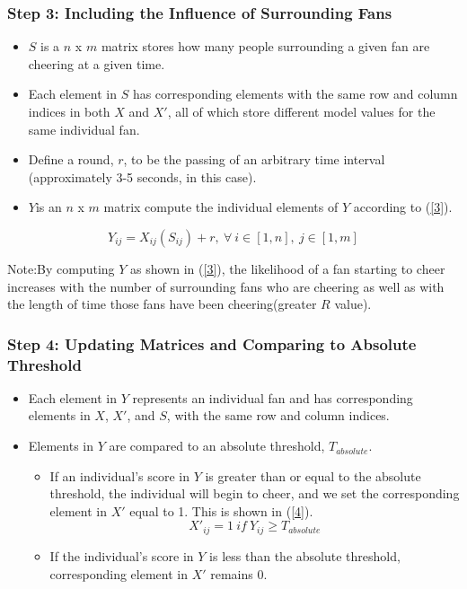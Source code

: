 \documentclass[compress,handout,10pt]{beamer}
\let\olditem\item
\renewcommand{\item}{\setlength{\itemsep}{0.5\baselineskip}\olditem}
\begin{document}
\begin{frame}
\frametitle{Step 3: Including the Influence of Surrounding Fans}
\begin{itemize}
\item $S$ is a $n$ x $m$ matrix stores how many people surrounding a given fan are cheering at a given time.
\item Each element in $S$ has corresponding elements with the same row and column indices in both $X$ and $X'$, all of which store different model values for the same individual fan. 
\item Define a round, $r$, to be the passing of an arbitrary time interval (approximately 3-5 seconds, in this case). 
\item $Y$is an $n$ x $m$ matrix compute the individual elements of $Y$ according to (\ref{3}). 
\end{itemize}
\begin{equation}
Y_{ij}=X_{ij}(S_{ij})+r,~\forall~i\in[1,n],~j\in[1,m]
\label{3}
\end{equation}
\item Note:By computing $Y$ as shown in (\ref{3}), the likelihood of a fan starting to cheer increases with the number of surrounding fans who are cheering as well as with the length of time those fans have been cheering(greater $R$ value).
\end{frame}

\begin{frame}
\frametitle{Step 4: Updating Matrices and Comparing to Absolute Threshold}
\begin{itemize}
\item Each element in $Y$ represents an individual fan and has corresponding elements in $X$, $X'$, and $S$, with the same row and column indices. 
\item Elements in $Y$  are compared to an absolute threshold, $T_{absolute}$.
	\begin{itemize} 
		\item If an individual's score in $Y$ is greater than or equal to the absolute threshold, the individual will begin to cheer, and we set the corresponding element in $X'$ equal to 1. This is shown in (\ref{4}).
		\begin{equation}
			X'_{ij}=1~if~Y_{ij}\geq T_{absolute}
			\label{4}
		\end{equation}
		\item If the individual's score in $Y$ is less than the absolute threshold, corresponding element in $X'$ remains 0.  
\end{itemize}
\end{itemize}
\end{frame}
\end{document}

